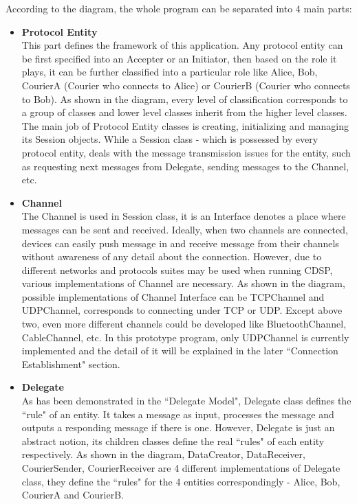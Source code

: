 According to the diagram, the whole program can be separated into 4 main parts:
\begin{itemize}
\item \textbf{Protocol Entity} \\
This part defines the framework of this application. Any protocol entity can be first specified into an Accepter or an Initiator, then based on the role it plays, it can be further classified into a particular role like Alice, Bob, CourierA (Courier who connects to Alice) or CourierB (Courier who connects to Bob). As shown in the diagram, every level of classification corresponds to a group of classes and lower level classes inherit from the higher level classes. The main job of Protocol Entity classes is creating, initializing and managing its Session objects. While a Session class - which is possessed by every protocol entity, deals with the message transmission issues for the entity, such as requesting next messages from Delegate, sending messages to the Channel, etc.

\item \textbf{Channel} \\
The Channel is used in Session class, it is an Interface denotes a place where messages can be sent and received. Ideally, when two channels are connected, devices can easily push message in and receive message from their channels without awareness of any detail about the connection. However, due to different networks and protocols suites may be used when running CDSP, various implementations of Channel are necessary. As shown in the diagram, possible implementations of Channel Interface can be TCPChannel and UDPChannel, corresponds to connecting under TCP or UDP. Except above two, even more different channels could be developed like BluetoothChannel, CableChannel, etc. In this prototype program, only UDPChannel is currently implemented and the detail of it will be explained in the later ``Connection Establishment" section.

\item \textbf{Delegate} \\
As has been demonstrated in the ``Delegate Model", Delegate class defines the ``rule" of an entity. It takes a message as input, processes the message and outputs a responding message if there is one. However, Delegate is just an abstract notion, its children classes define the real ``rules" of each entity respectively. As shown in the diagram, DataCreator, DataReceiver, CourierSender, CourierReceiver are 4 different implementations of Delegate class, they define the ``rules" for the 4 entities correspondingly - Alice, Bob, CourierA and CourierB.


\end{itemize}
